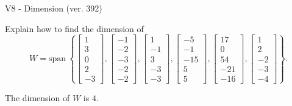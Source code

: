 \begin{exercise}
  \begin{exerciseTitle}V8 - Dimension (ver. 392)\end{exerciseTitle}
  \begin{exerciseStatement}
    Explain how to find the dimension of 
\[W=\mathrm{span}\ \left\{\left[\begin{array}{r}
1 \\
3 \\
0 \\
2 \\
-3
\end{array}\right] , \left[\begin{array}{r}
-1 \\
-2 \\
-3 \\
-2 \\
-2
\end{array}\right] , \left[\begin{array}{r}
1 \\
-1 \\
3 \\
-3 \\
-3
\end{array}\right] , \left[\begin{array}{r}
-5 \\
-1 \\
-15 \\
5 \\
5
\end{array}\right] , \left[\begin{array}{r}
17 \\
0 \\
54 \\
-21 \\
-16
\end{array}\right] , \left[\begin{array}{r}
1 \\
2 \\
-2 \\
-3 \\
-4
\end{array}\right]\right\}.\]



  \end{exerciseStatement}
  \begin{exerciseAnswer}
   The dimension of \(W\) is  \(4\).
  


  \end{exerciseAnswer}
\end{exercise}